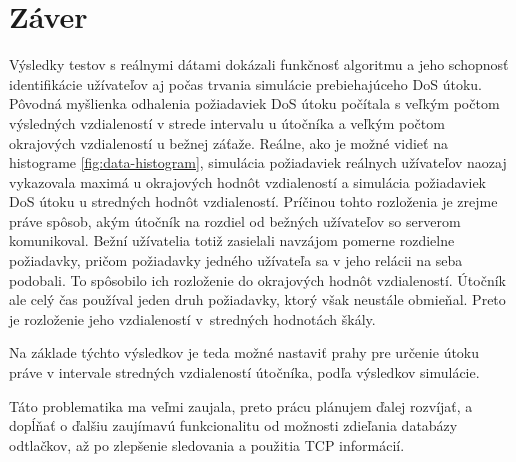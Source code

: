 \documentclass[
  printed, %
  table,   %
  lof,     %
  nolot,   %
  nocover
]{fithesis3}
\begin{document}
\chapter{Záver}
Výsledky testov s reálnymi dátami dokázali funkčnosť algoritmu a jeho schopnosť
identifikácie užívateľov aj počas trvania simulácie prebiehajúceho DoS útoku.
Pôvodná myšlienka
odhalenia požiadaviek DoS útoku počítala s veľkým počtom výsledných
vzdialeností v strede intervalu u útočníka a veľkým počtom okrajových vzdialeností u bežnej záťaže. 
Reálne, ako je možné vidieť na histograme \ref{fig:data-histogram},
simulácia požiadaviek reálnych užívateľov naozaj vykazovala maximá u okrajových hodnôt
vzdialeností a simulácia požiadaviek DoS útoku u stredných hodnôt vzdialeností. 
Príčinou tohto rozloženia je zrejme práve spôsob, akým útočník na rozdiel od
bežných užívateľov so serverom komunikoval. Bežní užívatelia totiž zasielali
navzájom pomerne rozdielne požiadavky, pričom požiadavky jedného užívateľa sa v jeho
relácii na seba podobali. To spôsobilo ich rozloženie do okrajových hodnôt
vzdialeností. Útočník ale celý čas používal jeden druh požiadavky, ktorý však
neustále obmieňal. Preto je rozloženie jeho vzdialeností v~stredných hodnotách
škály. 

Na základe týchto výsledkov je teda možné nastaviť prahy pre určenie útoku
práve v intervale stredných vzdialeností útočníka, podľa výsledkov simulácie.

Táto problematika ma veľmi zaujala, preto prácu plánujem ďalej rozvíjať,
a dopĺňať o ďalšiu zaujímavú funkcionalitu od možnosti zdieľania
databázy odtlačkov, až po zlepšenie sledovania a použitia TCP informácií.

\printbibliography
{} 

\makeatletter\thesis@blocks@clear\makeatother
{} %
\printindex

\appendix %
\end{document}
